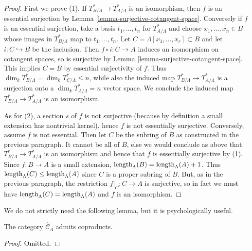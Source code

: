 \begin{proof}
First we prove (1). If $T^*_{B/\Lambda} \rightarrow T^*_{A/\Lambda}$ is an 
isomorphism, then $f$ is an essential surjection by Lemma 
\ref{lemma-surjective-cotangent-space}.  Conversely if $f$ is an essential 
surjection, take a basis $t_1, \dots, t_n$ for $T^*_{A/\Lambda}$ and choose 
$x_1, \dots, x_n \in B$ whose images in $T^*_{B/\Lambda}$ map to $t_1, \dots, 
t_n$. Let $C = \Lambda[x_1, \dots, x_r] \subset B$ and let $i: C 
\hookrightarrow B$ be the inclusion. Then $f \circ i: C \rightarrow A$ induces 
an isomorphism on cotangent spaces, so is surjective by Lemma 
\ref{lemma-surjective-cotangent-space}. This implies $C = B$ by essential 
surjectivity of $f$. Thus $\dim_{k} T^*_{B/\Lambda} = \dim_{k} T^*_{C/\Lambda} 
\leq n$, while also the induced map $T^*_{B/\Lambda} \rightarrow 
T^*_{A/\Lambda}$ is a surjection onto a $\dim_k T^*_{A/\Lambda} = n$ vector 
space.  We conclude the induced map $T^*_{B/\Lambda} \rightarrow 
T^*_{A/\Lambda}$ is an isomorphism.

\medskip \noindent
As for (2), a section $s$ of $f$ is not surjective (because by definition a 
small extension has nontrivial kernel), hence $f$ is not essentially 
surjective.  Conversely, assume $f$ is not essential.  Then let $C$ be the 
subring of $B$ as constructed in the previous paragraph.  It cannot be all of 
$B$, else we would conclude as above that $T^*_{B/\Lambda} \rightarrow 
T^*_{A/\Lambda}$ is an isomorphism and hence that $f$ is essentially surjective 
by (1).  Since $f: B \rightarrow A$ is a small extension, 
$\textnormal{length}_{\Lambda}(B) = \textnormal{length}_{\Lambda}(A) + 1$. Thus 
$\textnormal{length}_{\Lambda}(C) \leq \textnormal{length}_{\Lambda}(A)$ since 
$C$ is a proper subring of $B$.  But, as in the previous paragraph, the 
restriction $f|_{C}: C \rightarrow A$ is surjective, so in fact we must have 
$\textnormal{length}_{\Lambda}(C) = \textnormal{length}_{\Lambda}(A)$ and $f$ 
is an isomorphism.
\end{proof}

\noindent
We do not strictly need the following lemma, but it is psychologically useful.
\begin{lemma}
\label{lemma-CLambdahat-coproducts}
The category $\widehat{\mathcal C}_{\Lambda}$ admits coproducts.
\end{lemma}

\begin{proof}
Omitted.
\end{proof}

